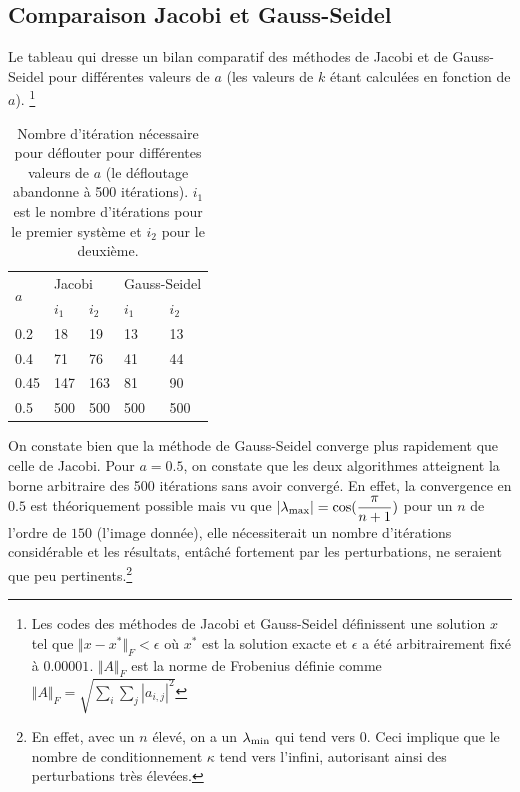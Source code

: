 \subsection{Comparaison Jacobi et Gauss-Seidel}
Le tableau qui dresse un bilan comparatif des méthodes de Jacobi et de Gauss-Seidel pour différentes valeurs de $a$ (les valeurs de $k$ étant calculées en fonction de $a$).
\footnote{Les codes des méthodes de Jacobi et Gauss-Seidel définissent une solution $x$
tel que $\Vert x-x^* \Vert_F < \epsilon$ où $x^*$ est la solution exacte et $\epsilon$ a été arbitrairement fixé à $0.00001$. $\Vert A \Vert_F$ est la norme de Frobenius définie comme $\Vert A \Vert_F = \sqrt{\sum_i \sum_j |a_{i,j}|^2}$}
\begin{table}
  \centering
  \begin{tabular}{|l|l|l|l|l|}
    \hline
    \multirow{2}{*}{$a$} & \multicolumn{2}{l|}{Jacobi} & \multicolumn{2}{l|}{Gauss-Seidel}\\
    \cline{2-5}
        & $i_1$ & $i_2$ & $i_1$ & $i_2$\\
    \hline
    0.2 & 18    & 19    & 13    & 13\\
    \hline
    0.4 & 71    & 76    & 41    & 44\\
    \hline
    0.45& 147   & 163   & 81    & 90\\
    \hline
    0.5 & 500   & 500   & 500   & 500\\
    \hline
  \end{tabular}
  \caption{Nombre d'itération nécessaire pour déflouter pour différentes valeurs de $a$ (le défloutage abandonne à 500 itérations).
  $i_1$ est le nombre d'itérations pour le premier système et $i_2$ pour le deuxième.}
  \label{tab:iter}
\end{table}
On constate bien que la méthode de Gauss-Seidel converge plus rapidement que celle de Jacobi. Pour $a=0.5$, on constate que les deux algorithmes atteignent la borne arbitraire des 500 itérations sans avoir convergé. En effet, la convergence en $0.5$ est théoriquement possible mais vu que $|\lambda_\mathrm{max}| = \cos(\dfrac{\pi}{n+1})$ pour un $n$ de l'ordre de $150$ (l'image donnée), elle nécessiterait un nombre d'itérations considérable et les résultats, entâché fortement par les perturbations, ne seraient que peu pertinents.\footnote{En effet, avec un $n$ élevé, on a un $\lambda_\mathrm{min}$ qui tend vers $0$. Ceci implique que le nombre de conditionnement $\kappa$ tend vers l'infini, autorisant ainsi des perturbations très élevées.} %

